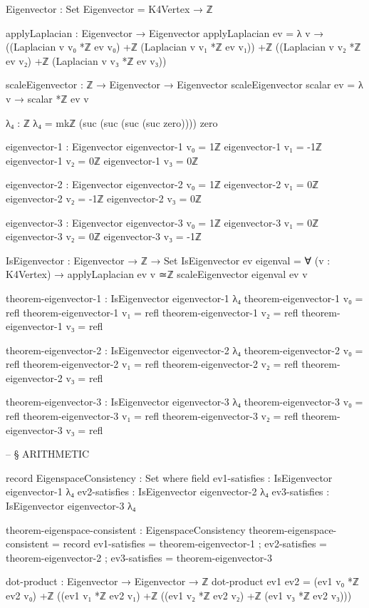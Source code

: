 \documentclass[11pt,a4paper]{book}
\begin{document}
\begin{code}
Eigenvector : Set
Eigenvector = K4Vertex → ℤ

applyLaplacian : Eigenvector → Eigenvector
applyLaplacian ev = λ v → 
  ((Laplacian v v₀ *ℤ ev v₀) +ℤ (Laplacian v v₁ *ℤ ev v₁)) +ℤ 
  ((Laplacian v v₂ *ℤ ev v₂) +ℤ (Laplacian v v₃ *ℤ ev v₃))

scaleEigenvector : ℤ → Eigenvector → Eigenvector
scaleEigenvector scalar ev = λ v → scalar *ℤ ev v

λ₄ : ℤ
λ₄ = mkℤ (suc (suc (suc (suc zero)))) zero

eigenvector-1 : Eigenvector
eigenvector-1 v₀ = 1ℤ
eigenvector-1 v₁ = -1ℤ
eigenvector-1 v₂ = 0ℤ
eigenvector-1 v₃ = 0ℤ

eigenvector-2 : Eigenvector
eigenvector-2 v₀ = 1ℤ
eigenvector-2 v₁ = 0ℤ
eigenvector-2 v₂ = -1ℤ
eigenvector-2 v₃ = 0ℤ

eigenvector-3 : Eigenvector
eigenvector-3 v₀ = 1ℤ
eigenvector-3 v₁ = 0ℤ
eigenvector-3 v₂ = 0ℤ
eigenvector-3 v₃ = -1ℤ

IsEigenvector : Eigenvector → ℤ → Set
IsEigenvector ev eigenval = ∀ (v : K4Vertex) → 
  applyLaplacian ev v ≃ℤ scaleEigenvector eigenval ev v

theorem-eigenvector-1 : IsEigenvector eigenvector-1 λ₄
theorem-eigenvector-1 v₀ = refl
theorem-eigenvector-1 v₁ = refl
theorem-eigenvector-1 v₂ = refl
theorem-eigenvector-1 v₃ = refl

theorem-eigenvector-2 : IsEigenvector eigenvector-2 λ₄
theorem-eigenvector-2 v₀ = refl
theorem-eigenvector-2 v₁ = refl
theorem-eigenvector-2 v₂ = refl
theorem-eigenvector-2 v₃ = refl

theorem-eigenvector-3 : IsEigenvector eigenvector-3 λ₄
theorem-eigenvector-3 v₀ = refl
theorem-eigenvector-3 v₁ = refl
theorem-eigenvector-3 v₂ = refl
theorem-eigenvector-3 v₃ = refl


-- § ARITHMETIC

record EigenspaceConsistency : Set where
  field
    ev1-satisfies : IsEigenvector eigenvector-1 λ₄
    ev2-satisfies : IsEigenvector eigenvector-2 λ₄
    ev3-satisfies : IsEigenvector eigenvector-3 λ₄

theorem-eigenspace-consistent : EigenspaceConsistency
theorem-eigenspace-consistent = record
  { ev1-satisfies = theorem-eigenvector-1
  ; ev2-satisfies = theorem-eigenvector-2
  ; ev3-satisfies = theorem-eigenvector-3
  }

dot-product : Eigenvector → Eigenvector → ℤ
dot-product ev1 ev2 = 
  (ev1 v₀ *ℤ ev2 v₀) +ℤ ((ev1 v₁ *ℤ ev2 v₁) +ℤ ((ev1 v₂ *ℤ ev2 v₂) +ℤ (ev1 v₃ *ℤ ev2 v₃)))


\end{code}
\end{document}
